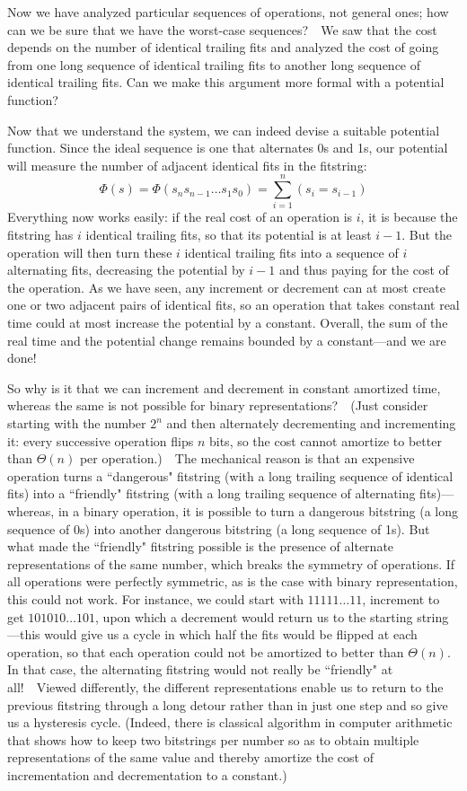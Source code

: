 \documentclass[11pt]{article}
\begin{document}
Now we have analyzed particular sequences of operations, not general ones; how
can we be sure that we have the worst-case sequences?\ \ We saw that the cost
depends on the number of identical trailing fits and analyzed the cost of going
from one long sequence of identical trailing fits to another long sequence of
identical trailing fits.  Can we make this argument more formal with a
potential function?

Now that we understand the system, we can indeed devise a suitable potential
function.  Since the ideal sequence is one that alternates 0s and 1s, our
potential will measure the number of adjacent identical fits in the fitstring:
  $$\Phi(s) = \Phi(s_n s_{n-1} \ldots s_1 s_0) = \sum_{i=1}^n (s_i = s_{i-1})$$
Everything now works easily: if the real cost of an operation is $i$, it is
because the fitstring has $i$ identical trailing fits, so that its potential is
at least $i-1$.  But the operation will then turn these $i$ identical trailing
fits into a sequence of $i$ alternating fits, decreasing the potential by $i-1$
and thus paying for the cost of the operation.  As we have seen, any increment
or decrement can at most create one or two adjacent pairs of identical fits, so
an operation that takes constant real time could at most increase the potential
by a constant.  Overall, the sum of the real time and the potential change
remains bounded by a constant---and we are done!

So why is it that we can increment and decrement in constant amortized time,
whereas the same is not possible for binary representations?\ \ (Just consider
starting with the number $2^n$ and then alternately decrementing and
incrementing it: every successive operation flips $n$ bits, so the cost cannot
amortize to better than $\Theta(n)$ per operation.)\ \ The mechanical reason is
that an expensive operation turns a ``dangerous" fitstring (with a long
trailing sequence of identical fits) into a ``friendly" fitstring (with a long
trailing sequence of alternating fits)---whereas, in a binary operation, it is
possible to turn a dangerous bitstring (a long sequence of 0s) into another
dangerous bitstring (a long sequence of 1s).   But what made the ``friendly"
fitstring possible is the presence of alternate representations of the same
number, which breaks the symmetry of operations.  If all operations were
perfectly symmetric, as is the case with binary representation, this could not
work.  For instance, we could start with $11111\ldots 11$, increment to get
$101010\ldots 101$, upon which a decrement would return us to the starting
string---this would give us a cycle in which half the fits would be flipped at
each operation, so that each operation could not be amortized to better than
$\Theta(n)$.  In that case, the alternating fitstring would not really be
``friendly" at all!\ \ Viewed differently, the different representations enable
us to return to the previous fitstring through a long detour rather than in
just one step and so give us a hysteresis cycle.  (Indeed, there is classical
algorithm in computer arithmetic that shows how to keep two bitstrings per
number so as to obtain multiple representations of the same value and thereby
amortize the cost of incrementation and decrementation to a constant.)
\end{document}
